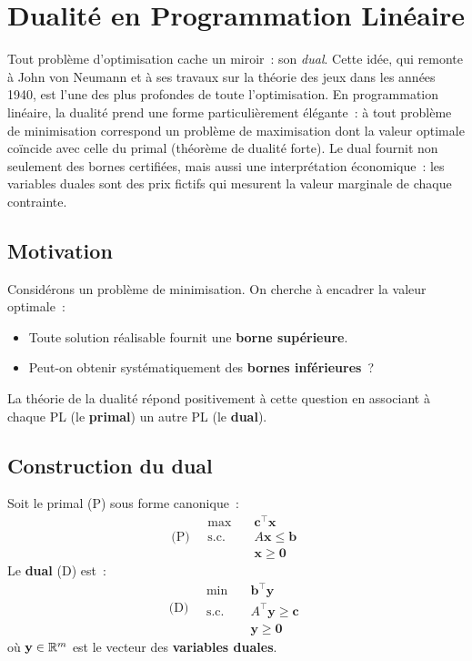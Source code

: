 \chapter{Dualit\'e en Programmation Lin\'eaire}
\label{ch:dualite}

Tout probl\`eme d'optimisation cache un miroir~: son \emph{dual}. Cette id\'ee, qui remonte \`a John von Neumann et \`a ses travaux sur la th\'eorie des jeux dans les ann\'ees 1940, est l'une des plus profondes de toute l'optimisation. En programmation lin\'eaire, la dualit\'e prend une forme particuli\`erement \'el\'egante~: \`a tout probl\`eme de minimisation correspond un probl\`eme de maximisation dont la valeur optimale co\"incide avec celle du primal (th\'eor\`eme de dualit\'e forte). Le dual fournit non seulement des bornes certifi\'ees, mais aussi une interpr\'etation \'economique~: les variables duales sont des \og prix fictifs \fg qui mesurent la valeur marginale de chaque contrainte.

\section{Motivation}

Consid\'erons un probl\`eme de minimisation.  On cherche \`a encadrer la valeur
optimale~:
\begin{itemize}
  \item Toute solution r\'ealisable fournit une \textbf{borne sup\'erieure}.
  \item Peut-on obtenir syst\'ematiquement des \textbf{bornes inf\'erieures}~?
\end{itemize}
La th\'eorie de la dualit\'e r\'epond positivement \`a cette question en
associant \`a chaque PL (le \textbf{primal}) un autre PL (le \textbf{dual}).

\section{Construction du dual}

\begin{definition}
\label{def:primal_dual}
Soit le primal (P) sous forme canonique~:
\[
\text{(P)} \quad
\begin{aligned}
  \max \quad & \mathbf{c}^\top \mathbf{x} \\
  \text{s.c.} \quad & A\mathbf{x} \le \mathbf{b} \\
  & \mathbf{x} \ge \mathbf{0}
\end{aligned}
\]
Le \textbf{dual} (D) est~:
\[
\text{(D)} \quad
\begin{aligned}
  \min \quad & \mathbf{b}^\top \mathbf{y} \\
  \text{s.c.} \quad & A^\top \mathbf{y} \ge \mathbf{c} \\
  & \mathbf{y} \ge \mathbf{0}
\end{aligned}
\]
o\`u $\mathbf{y} \in \mathbb{R}^m$ est le vecteur des \textbf{variables duales}.
\end{definition}

